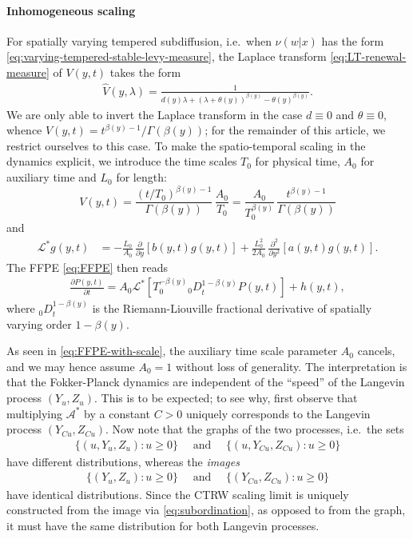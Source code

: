 \documentclass[a4paper,12pt]{elsarticle}
\numberwithin{equation}{section}
\theoremstyle{plain}
\theoremstyle{definition}
\theoremstyle{remark}
\numberwithin{equation}{section}
\newcommand{\1}{\mathbf 1}
\newcommand{\del}{\partial}
\begin{document}
\paragraph{Inhomogeneous scaling}
For spatially varying tempered subdiffusion, i.e.\ when $\nu(w|x)$ has the form 
\eqref{eq:varying-tempered-stable-levy-measure}, 
the Laplace transform \eqref{eq:LT-renewal-measure} of $V(y,t)$ takes the form
\begin{align}
\hat V(y,\lambda) =
\frac{1}{d(y) \lambda + (\lambda + \theta(y))^{\beta(y)} - \theta(y)^{\beta(y)}}.
\end{align}
We are only able to invert the Laplace transform in the case $d \equiv 0$ and
$\theta \equiv 0$, whence $V(y,t) = t^{\beta(y)-1} / \Gamma(\beta(y))$; 
for the remainder of this article, we restrict ourselves to this case.
To make the spatio-temporal scaling in the dynamics explicit, we introduce the time scales
$T_0$ for physical time, $A_0$ for auxiliary time and $L_0$ for length:
$$V(y,t) = \frac{(t/T_0)^{\beta(y)-1}}{\Gamma(\beta(y))}\, \frac{A_0}{T_0}
= \frac{A_0}{T_0^{\beta(y)}} \, \frac{t^{\beta(y) - 1}}{\Gamma(\beta(y))}$$
and
\begin{align}
\mathcal L^* g(y,t)
&= -\frac{L_0}{A_0}\,\frac{\partial }{\partial y}[b(y,t) g(y,t)]
+\frac{L_0^2}{2A_0}\,\frac{\partial^2 }{\partial y^2}[a(y,t) g(y,t)].
\end{align}
The FFPE \eqref{eq:FFPE} then reads
\begin{align} \label{eq:FFPE-with-scale}
\frac{\del P(y,t)}{\del t}
= A_0 \mathcal L^* \left[ T_0^{-\beta(y)} {_0 D}_t^{1-\beta(y)} P(y,t) \right] + h(y,t),
\end{align}
where $_0 D_t^{1-\beta(y)}$ is the Riemann-Liouville
fractional derivative of spatially varying order $1-\beta(y)$.

As seen in \eqref{eq:FFPE-with-scale}, the auxiliary time scale parameter $A_0$ cancels, and we may hence assume $A_0 = 1$ without loss of generality. The interpretation is that the
Fokker-Planck dynamics are independent of the ``speed'' of the Langevin process
$(Y_u, Z_u)$.  This is to be expected; to see why, first observe that
multiplying $\mathcal A^*$ by a constant $C > 0$ uniquely corresponds to the
Langevin process $(Y_{Cu}, Z_{Cu})$. 
Now note that the graphs of the two processes, i.e.\ the sets
\begin{align*}
\{(u, Y_u, Z_u): u \ge 0\} \quad \text{ and } \quad 
\{(u, Y_{Cu}, Z_{Cu}): u \ge 0\}
\end{align*}
have different distributions, whereas the \emph{images}
\begin{align*}
\{(Y_u, Z_u): u \ge 0\} \quad \text{ and } \quad 
\{(Y_{Cu}, Z_{Cu}): u \ge 0\}
\end{align*}
have identical distributions. 
Since the CTRW scaling limit is uniquely constructed from the image via 
\eqref{eq:subordination},
as opposed to from the graph,
it must have the same distribution for both Langevin processes.
\end{document}
